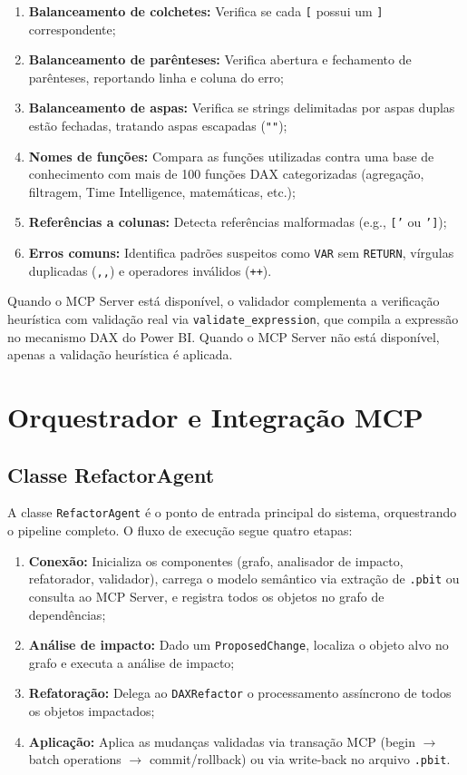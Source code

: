\documentclass[
    12pt,               %
    openright,          %
    oneside,            %
    a4paper,            %
    chapter=TITLE,      %
    section=TITLE,      %
    brazil              %
]{abntex2}
\begin{document}
\begin{enumerate}
    \item \textbf{Balanceamento de colchetes:} Verifica se cada \texttt{[} possui um \texttt{]} correspondente;
    \item \textbf{Balanceamento de parênteses:} Verifica abertura e fechamento de parênteses, reportando linha e coluna do erro;
    \item \textbf{Balanceamento de aspas:} Verifica se strings delimitadas por aspas duplas estão fechadas, tratando aspas escapadas (\texttt{""});
    \item \textbf{Nomes de funções:} Compara as funções utilizadas contra uma base de conhecimento com mais de 100 funções DAX categorizadas (agregação, filtragem, Time Intelligence, matemáticas, etc.);
    \item \textbf{Referências a colunas:} Detecta referências malformadas (e.g., \texttt{['} ou \texttt{']});
    \item \textbf{Erros comuns:} Identifica padrões suspeitos como \texttt{VAR} sem \texttt{RETURN}, vírgulas duplicadas (\texttt{,,}) e operadores inválidos (\texttt{++}).
\end{enumerate}

Quando o MCP Server está disponível, o validador complementa a verificação heurística com validação real via \texttt{validate\_expression}, que compila a expressão no mecanismo DAX do Power BI. Quando o MCP Server não está disponível, apenas a validação heurística é aplicada.

\section{Orquestrador e Integração MCP}

\subsection{Classe RefactorAgent}

A classe \texttt{RefactorAgent} é o ponto de entrada principal do sistema, orquestrando o pipeline completo. O fluxo de execução segue quatro etapas:

\begin{enumerate}
    \item \textbf{Conexão:} Inicializa os componentes (grafo, analisador de impacto, refatorador, validador), carrega o modelo semântico via extração de \texttt{.pbit} ou consulta ao MCP Server, e registra todos os objetos no grafo de dependências;
    \item \textbf{Análise de impacto:} Dado um \texttt{ProposedChange}, localiza o objeto alvo no grafo e executa a análise de impacto;
    \item \textbf{Refatoração:} Delega ao \texttt{DAXRefactor} o processamento assíncrono de todos os objetos impactados;
    \item \textbf{Aplicação:} Aplica as mudanças validadas via transação MCP (begin $\rightarrow$ batch operations $\rightarrow$ commit/rollback) ou via write-back no arquivo \texttt{.pbit}.
\end{enumerate}
\end{document}
